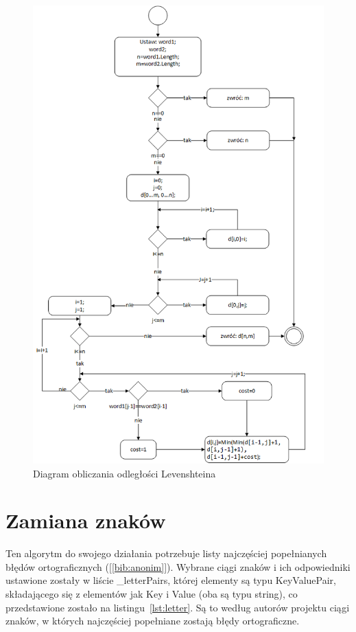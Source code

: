 \begin{figure} [H]
	\centering
	\includegraphics[width=1\linewidth]{rozdzial02/Levenstein-Count.png}
	\caption{Diagram obliczania odległości Levenshteina}
	\label{fig:Lev-Count}
\end{figure}


\section{Zamiana znaków}
\label{chap:Letter}
Ten algorytm do swojego działania potrzebuje listy najczęściej popełnianych błędów ortograficznych ([\ref{bib:anonim}]). Wybrane ciągi znaków i ich odpowiedniki ustawione zostały w liście \_letterPairs, której elementy są typu KeyValuePair, składającego się z elementów jak Key i Value (oba są typu string), co przedstawione zostało na listingu~\ref{lst:letter}. Są to według autorów projektu ciągi znaków, w których najczęściej popełniane zostają błędy ortograficzne. 

